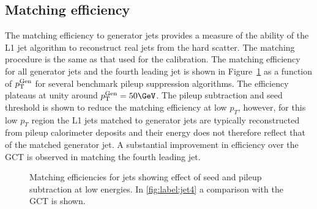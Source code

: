 \subsection{Matching efficiency}

The matching efficiency to generator jets provides a measure of the ability of the L1 jet algorithm 
to reconstruct real jets from the hard scatter. The matching procedure is the same as that used for the calibration. 
The matching efficiency for all generator jets and the fourth leading jet is shown 
in Figure~\ref{fig:match} as a function of ${p_{\text T}^{\text{Gen}}}$ for several benchmark pileup suppression algorithms. 
The efficiency plateaus at unity around $\Genpt=50\GeV$. The pileup subtraction and seed threshold is shown to reduce
the matching efficiency at low $p_T$, however, for this low $p_T$ region the L1 jets matched to generator jets are typically
reconstructed from pileup calorimeter deposits and their energy does not therefore
reflect that of the matched generator jet. A substantial improvement in efficiency over the GCT is observed in 
matching the fourth leading jet.





\begin{figure}
\begin{center}
\caption{Matching efficiencies for jets showing effect of seed and pileup subtraction at low energies. In \ref{fig:label:jet4} 
a comparison with the GCT is shown.}
\label{fig:match}
\end{center}
\end{figure}

